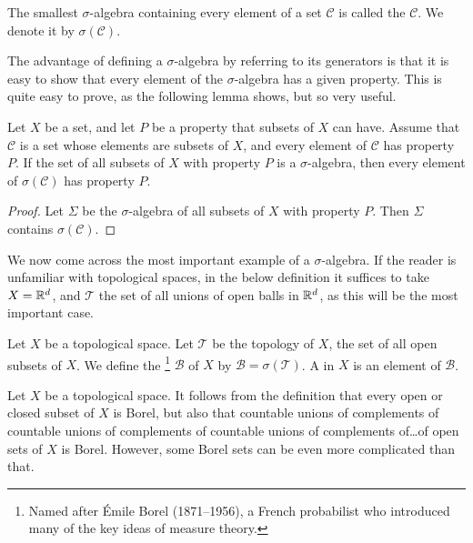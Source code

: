 \begin{definition}
The smallest $\sigma$-algebra containing every element of a set $\mathcal C$ is called the  $\mathcal C$.
We denote it by $\sigma(\mathcal C)$.
\end{definition}

\begin{subsec}
The advantage of defining a $\sigma$-algebra by referring to its generators is that it is easy to show that every element of the $\sigma$-algebra has a given property.
This is quite easy to prove, as the following lemma shows, but so very useful.
\end{subsec}

\begin{lemma}\label{generators and relations}
Let $X$ be a set, and let $P$ be a property that subsets of $X$ can have.
Assume that $\mathcal C$ is a set whose elements are subsets of $X$, and every element of $\mathcal C$ has property $P$.
If the set of all subsets of $X$ with property $P$ is a $\sigma$-algebra, then every element of $\sigma(\mathcal C)$ has property $P$.
\end{lemma}
\begin{proof}
Let $\Sigma$ be the $\sigma$-algebra of all subsets of $X$ with property $P$.
Then $\Sigma$ contains $\sigma(\mathcal C)$.
\end{proof}

\begin{subsec}
We now come across the most important example of a $\sigma$-algebra.
If the reader is unfamiliar with topological spaces, in the below definition it suffices to take $X = \mathbb{R}^{d}$, and $\mathcal T$ the set of all unions of open balls in $\mathbb{R}^{d}$, as this will be the most important case.
\end{subsec}

\begin{definition}
Let $X$ be a topological space.
Let $\mathcal T$ be the topology of $X$, the set of all open subsets of $X$.
We define the \footnote{Named after Émile Borel (1871--1956), a French probabilist who introduced many of the key ideas of measure theory.}
$\mathcal B$ of $X$ by $\mathcal B = \sigma(\mathcal T)$.
A  in $X$ is an element of $\mathcal B$.
\end{definition}

\begin{subsec}
Let $X$ be a topological space.
It follows from the definition that every open or closed subset of $X$ is Borel, but also that countable unions of complements of countable unions of complements of countable unions of complements of\dots of open sets of $X$ is Borel.
However, some Borel sets can be even more complicated than that.
\end{subsec}

